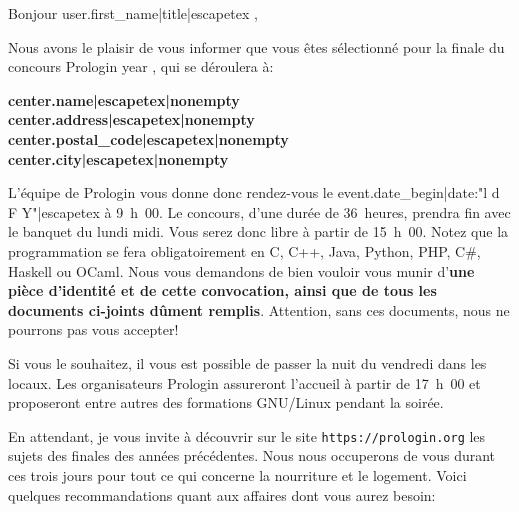 \documentclass[a4paper,11pt]{article}
\begin{document}
\def\objet{Convocation à la finale Prologin {{ year }} }

{%
{%

\def\destinataire{%
{{ user.get_full_name|title|escapetex|nonempty }}\\
{{ user.address|escapetex|nonempty }}\\
{{ user.postal_code|escapetex|nonempty }} {{ user.city|escapetex|nonempty }}%
}
\header

Bonjour {{ user.first_name|title|escapetex }},

Nous avons le plaisir de vous informer que vous êtes sélectionné
pour la finale du concours Prologin {{ year }}, qui se déroulera à:

{\par\smallskip\noindent\centering
\begin{minipage}{0.5\textwidth}
\textbf{%
{{ center.name|escapetex|nonempty }}%
}\\
\textbf{%
{{ center.address|escapetex|nonempty }}%
}\\
\textbf{%
{{ center.postal_code|escapetex|nonempty }} {{ center.city|escapetex|nonempty }}%
}
\end{minipage}
\par\smallskip}

L'équipe de Prologin vous donne donc rendez-vous le {{ event.date_begin|date:"l d F Y"|escapetex }}
à 9~h~00. Le concours, d'une durée de 36~heures, prendra fin avec le banquet du
lundi midi. Vous serez donc libre à partir de 15~h~00. Notez que la
programmation se fera obligatoirement en C, C++, Java, Python, PHP, C\#,
Haskell ou OCaml. Nous vous demandons de bien vouloir vous munir d'\textbf{une
pièce d'identité et de cette convocation, ainsi que de tous les documents
ci-joints dûment remplis}. Attention, sans ces documents, nous ne pourrons pas
vous accepter!

Si vous le souhaitez, il vous est possible de passer la nuit du vendredi dans
les locaux. Les organisateurs Prologin assureront l'accueil à partir de 17~h~00
et proposeront entre autres des formations GNU/Linux pendant la soirée.

En attendant, je vous invite à découvrir sur le site
\texttt{https://prologin.org} les sujets des finales des années précédentes.
Nous nous occuperons de vous durant ces trois jours pour tout ce qui concerne
la nourriture et le logement. Voici quelques recommandations quant aux affaires
dont vous aurez besoin:

}}
\end{document}

